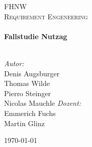 \begin{titlepage}
\begin{center}
\textsc{\LARGE FHNW}\\[1.5cm]
\textsc{\Large Requirement Engeneering}\\[0.5cm]
\HRule \\[0.4cm]
{ \huge \bfseries Fallstudie Nutzag}\\[0.4cm]
\HRule \\[1.5cm]
\begin{minipage}{1.2\textwidth}
\begin{flushleft} \large
\emph{Autor:}\\
Denis Augsburger\\
Thomas Wilde\\
Pierro Steinger\\
Nicolas Mauchle
\newline
\newline
\emph{Dozent:} \\
Emmerich Fuchs\\
Martin Glinz
\end{flushleft}
\end{minipage}
\vfill
{\large \today}
\end{center}
\end{titlepage}